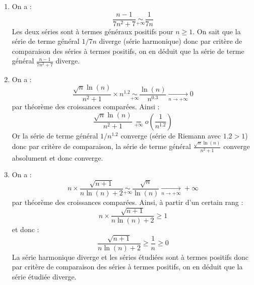 \documentclass[a4paper,twoside,french,10pt]{VcCours}
\begin{document}
\begin{enumerate}
\item On a :
$$ \frac{n-1}{7n^2+7} \underset{+ \infty}{\sim} \frac{1}{7n}$$
Les deux séries sont à termes généraux positifs pour $n \geq 1$. On sait que la série de terme général $1/7n$ diverge (série harmonique) donc par critère de comparaison des séries à termes positifs, on en déduit que la série de terme général $ \frac{n-1}{7n^2+7}$ diverge.
\item On a :
$$ \frac{\sqrt{n}\ln(n)}{n^2+1} \times n^{1.2} \underset{+ \infty}{\sim}  \frac{\ln(n)}{n^{0.3}} \underset{n \rightarrow + \infty}{\longrightarrow} 0$$
par théorème des croissances comparées. Ainsi :
$$ \frac{\sqrt{n}\ln(n)}{n^2+1} \underset{+\infty}{=} o \left( \frac{1}{n^{1.2}} \right)$$
Or la série de terme général $1/n^{1.2}$ converge (série de Riemann avec $1.2 >1$) donc par critère de comparaison, la série de terme général $\frac{\sqrt{n}\ln(n)}{n^2+1}$ converge absolument et donc converge.
\item On a :
$$ n \times \frac{\sqrt{n+1}}{n\ln(n)+2} \underset{+ \infty}{\sim} \dfrac{\sqrt{n}}{\ln(n)}\underset{n \rightarrow + \infty}{\longrightarrow} + \infty$$
par théorème des croissances comparées. Ainsi, à partir d'un certain rang :
$$ n \times \frac{\sqrt{n+1}}{n\ln(n)+2} \geq 1$$
et donc :
$$ \frac{\sqrt{n+1}}{n\ln(n)+2} \geq \dfrac{1}{n} \geq 0$$
La série harmonique diverge et les séries étudiées sont à termes positifs donc par critère de comparaison des séries à termes positifs, on en déduit que la série étudiée diverge.


\end{enumerate}
\end{document}
